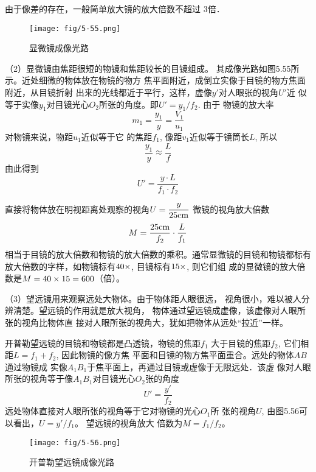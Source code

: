 由于像差的存在，一般简单放大镜的放大倍数不超过
3倍．

\begin{figure}[htp]\centering
    \texttt{[image: fig/5-55.png]}
        \caption{显微镜成像光路}
        \end{figure}

（2）显微镜由焦距很短的物镜和焦距较长的目镜组成。
其成像光路如图5.55所示。近处细微的物体放在物镜的物方
焦平面附近，成倒立实像于目镜的物方焦面附近，从目镜折射
出来的光线都近于平行，这样，虚像$y'$对人眼张的视角$U'$近
似等于实像$y_1$对目镜光心$O_2$所张的角度。即$U'=y_1/f_2$. 
由于
物镜的放大率
\[m_1=\frac{y_1}{y}=\frac{V_1}{u_1}\]
对物镜来说，物距$u_1$近似等于它
的焦距$f_1$, 像距$v_1$近似等于镜筒长$L$, 所以
\[\frac{y_1}{y}\approx \frac{L}{f}\]
由此得到
\[U'=\frac{y\cdot L}{f_1\cdot f_2}\]

直接将物体放在明视距离处观察的视角$U=\dfrac{y}{25{\rm cm}}$
微镜的视角放大倍数
\[M=\frac{25{\rm cm}}{f_2}\cdot \frac{L}{f_1}\]
相当于目镜的放大倍数和物镜的放大倍数的乘积。通常显微镜的目镜和物镜都标有
放大倍数的字样，如物镜标有$40\times$, 目镜标有$15\times$, 则它们组
成的显微镜的放大倍数是$M=40\times15=600$（倍）。

（3）望远镜用来观察远处大物体。由于物体距人眼很远，
视角很小，难以被人分辨清楚。望远镜的作用就是放大视角，
物体通过望远镜成虚像，该虚像对人眼所张的视角比物体直
接对人眼所张的视角大，犹如把物体从远处“拉近”一样。

开普勒望远镜的目镜和物镜都是凸透镜，物镜的焦距$f_1$
大于目镜的焦距$f_2$, 它们相距$L=f_1+f_2$, 因此物镜的像方焦
平面和目镜的物方焦平面重合。远处的物体$AB$通过物镜成
实像$A_1B_1$于焦平面上，再通过目镜或虚像于无限远处．该虚
像对人眼所张的视角等于像$A_1B_1$对目镜光心$O_2$张的角度
\[U'=\frac{y'}{f_2}\]
远处物体直接对人眼所张的视角等于它对物镜的光心$O_1$所
张的视角$U$, 由图5.56可以看出，$U=y'/f_1$。
望远镜的视角放大
倍数为$M=f_1/f_2$。

\begin{figure}[htp]\centering
    \texttt{[image: fig/5-56.png]}
        \caption{开普勒望远镜成像光路}
        \end{figure}

